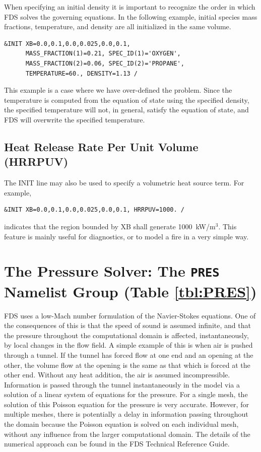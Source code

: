 \documentclass[11pt]{book}
\begin{document}
When specifying an initial density it is important to recognize the order in which FDS solves the governing equations. In the following example, initial species mass fractions, temperature, and density are all initialized in the same volume.
\begin{lstlisting}
&INIT XB=0.0,0.1,0.0,0.025,0.0,0.1,
      MASS_FRACTION(1)=0.21, SPEC_ID(1)='OXYGEN',
      MASS_FRACTION(2)=0.06, SPEC_ID(2)='PROPANE',
      TEMPERATURE=60., DENSITY=1.13 /
\end{lstlisting}
This example is a case where we have over-defined the problem. Since the temperature is computed from the equation of state using the specified density, the specified temperature will not, in general, satisfy the equation of state, and FDS will overwrite the specified temperature.

\subsection*{Heat Release Rate Per Unit Volume (HRRPUV)}

The {\ct INIT} line may also be used to specify a volumetric heat source term. For example,
\begin{lstlisting}
&INIT XB=0.0,0.1,0.0,0.025,0.0,0.1, HRRPUV=1000. /
\end{lstlisting}
indicates that the region bounded by {\ct XB} shall generate 1000~kW/m$^3$. This feature is mainly useful for diagnostics, or to model a fire in a very simple way.






\section{The Pressure Solver: The \texorpdfstring{{\tt PRES}}{PRES} Namelist Group (Table \ref{tbl:PRES})}
\label{info:PRES}

FDS uses a low-Mach number formulation of the Navier-Stokes equations. One of the consequences of this is that the speed of sound is
assumed infinite, and that the pressure throughout the computational domain is affected, instantaneously, by local changes in the flow field. A simple example of
this is when air is pushed through a tunnel. If the tunnel has forced flow at one end and an opening at the other, the volume flow at the opening is the same
as that which is forced at the other end. Without any heat addition, the air is assumed incompressible. Information is passed through the tunnel
instantaneously in the model via a solution of a linear system of equations for the pressure. For a single mesh, the solution of this Poisson equation for
the pressure is very accurate. However, for multiple meshes, there is potentially a delay in information passing throughout the domain because the Poisson
equation is solved on each individual mesh, without any influence from the larger computational domain. The details of the numerical approach can be found in the
FDS Technical Reference Guide.
\end{document}

